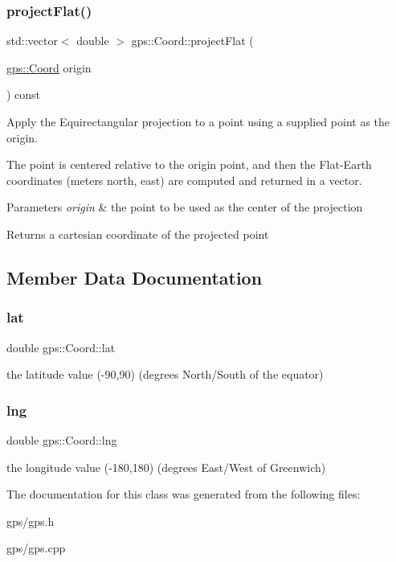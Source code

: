 \subsubsection{\texorpdfstring{project\+Flat()}{projectFlat()}}
{\footnotesize\ttfamily std\+::vector$<$ double $>$ gps\+::\+Coord\+::project\+Flat (\begin{DoxyParamCaption}\item[{\hyperlink{classgps_1_1Coord}{gps\+::\+Coord}}]{origin }\end{DoxyParamCaption}) const}

Apply the Equirectangular projection to a point using a supplied point as the origin.

The point is centered relative to the origin point, and then the Flat-\/\+Earth coordinates (meters north, east) are computed and returned in a vector.


\begin{DoxyParams}{Parameters}
{\em origin} & the point to be used as the center of the projection \\
\hline
\end{DoxyParams}
\begin{DoxyReturn}{Returns}
a cartesian coordinate of the projected point 
\end{DoxyReturn}


\subsection{Member Data Documentation}
\mbox{\label{classgps_1_1Coord_a17cbbd7580a83c42f650b8f93e14d98e}} 
\subsubsection{\texorpdfstring{lat}{lat}}
{\footnotesize\ttfamily double gps\+::\+Coord\+::lat}

the latitude value (-\/90,90) (degrees North/\+South of the equator) \mbox{\label{classgps_1_1Coord_abca98aaabe2dc3cf50ebdd687c2f47e8}} 
\subsubsection{\texorpdfstring{lng}{lng}}
{\footnotesize\ttfamily double gps\+::\+Coord\+::lng}

the longitude value (-\/180,180) (degrees East/\+West of Greenwich) 

The documentation for this class was generated from the following files\+:\begin{DoxyCompactItemize}
\item 
gps/gps.\+h\item 
gps/gps.\+cpp\end{DoxyCompactItemize}
